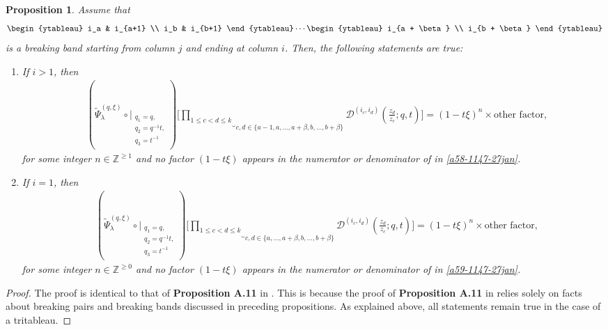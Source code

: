 \documentclass[12pt,reqno,a4paper]{amsart}
\newcommand{\comp}{\circ}
\newcommand{\cals}[1]{\mathcal{#1}}
\newcommand{\bb}[1]{\mathbb{#1}}
\numberwithin{equation}{section}
\newtheorem{prop}[thm]{Proposition}
\newcommand{\dualmap}{
\widetilde{\Psi}^{(q,\xi)}_{\lambda}
}
\theoremstyle{definition}
\begin{document}
\begin{prop}
Assume that
\begin{align}
	\begin{ytableau}
		i_a & i_{a+1}
		\\
		i_b & i_{b+1}
	\end{ytableau}
	\cdots
	\begin{ytableau}
		i_{a + \beta}
		\\
		i_{b + \beta}
	\end{ytableau}
	\label{eqna56-1256-27jan}
\end{align}
is a breaking band starting from column $j$ and ending at column $i$. Then, the following statements are true:
\begin{enumerate}[(1)]
\item If $i > 1$, then 
\begin{align}
	&(
	\dualmap
	\comp 
	\bigg|_{
		\substack{
			q_1 = q, \\
			q_2 = q^{-1}t,\\
			q_3 = t^{-1} \\
		}
	}
	)
	\Bigg[
	\underbrace{		\prod_{1 \leq c < d \leq k}			}_{c,d \in \{a-1,a,\dots,a+\beta, b, \dots, b+\beta\}}
	\cals{D}^{(i_c,i_d)}\left(
	\frac{z_d}{z_c}
	; q, t
	\right)
	\Bigg]
	= 
	(1-t\xi)^n
	\times
	\text{other factor}, 
	\label{a58-1147-27jan}
\end{align}
for some integer $n \in \bb{Z}^{\geq 1}$ and no factor $(1 - t\xi)$ appears in the numerator or denominator of  in \eqref{a58-1147-27jan}. 
\item If $i = 1$, then 
\begin{align}
	&(
	\dualmap
	\comp 
	\bigg|_{
		\substack{
			q_1 = q, \\
			q_2 = q^{-1}t,\\
			q_3 = t^{-1} \\
		}
	}
	)
	\Bigg[
	\underbrace{		\prod_{1 \leq c < d \leq k}			}_{c,d \in \{a,\dots,a+\beta, b, \dots, b+\beta\}}
	\cals{D}^{(i_c,i_d)}\left(
	\frac{z_d}{z_c}
	; q, t
	\right)
	\Bigg]
	= 
	(1-t\xi)^n
	\times
	\text{other factor}, 
	\label{a59-1147-27jan}
\end{align}
for some integer $n \in \bb{Z}^{\geq 0}$ and no factor $(1 - t\xi)$ appears in the numerator or denominator of  in \eqref{a59-1147-27jan}. 
\end{enumerate}
\end{prop}
\begin{proof}
The proof is identical to that of \textbf{Proposition A.11} in \cite{CSW2025}. This is because the proof of \textbf{Proposition A.11} in \cite{CSW2025} relies solely on facts about breaking pairs and breaking bands discussed in preceding propositions. As explained above, all statements remain true in the case of a tritableau.
\end{proof}
\end{document}
